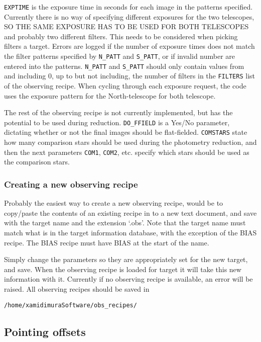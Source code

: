 \documentclass[a4paper,12pt]{article}
\begin{document}
{\tt EXPTIME} is the exposure time in seconds for each image in the patterns specified. Currently there is no way of specifying different exposures for the two telescopes, {\color{blue} SO THE SAME EXPOSURE HAS TO BE USED FOR BOTH TELESCOPES} and probably two different filters. This needs to be considered when picking filters a target. Errors are logged if the number of exposure times does not match the filter patterns specified by {\tt N\_PATT} and {\tt S\_PATT}, or if invalid number are entered into the patterns. {\tt N\_PATT} and {\tt S\_PATT} should only contain values from and including 0, up to but not including, the number of filters in the {\tt FILTERS} list of the observing recipe. When cycling through each exposure request, the code uses the exposure pattern for the North-telescope for both telescope.

The rest of the observing recipe is not currently implemented, but has the potential to be used during reduction. {\tt DO\_FFIELD} is a Yes/No parameter, dictating whether or not the final images should be flat-fielded. {\tt COMSTARS} state how many comparison stars should be used during the photometry reduction, and then the next parameters {\tt COM1}, {\tt COM2}, etc. specify which stars should be used as the comparison stars.

\subsubsection{Creating a new observing recipe}

Probably the easiest way to create a new observing recipe, would be to copy/paste the contents of an existing recipe in to a new text document, and save with the target name and the extension `.obs'. Note that the target name must match what is in the target information database, with the exception of the BIAS recipe. The BIAS recipe must have BIAS at the start of the name. 

Simply change the parameters so they are appropriately set for the new target, and save. When the observing recipe is loaded for target it will take this new information with it. Currently if no observing recipe is available, an error will be raised. All observing recipes should be saved in 
\begin{verbatim}
/home/xamidimuraSoftware/obs_recipes/
\end{verbatim}


\subsection{Pointing offsets}
\label{subsec:pointingOffsets}
\end{document}
